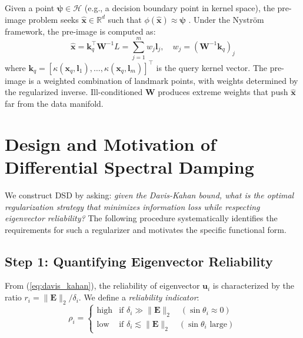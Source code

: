 \documentclass[journal]{IEEEtran}
\begin{document}
Given a point $\bm{\psi} \in \mathcal{H}$ (e.g., a decision boundary point in kernel space), the pre-image problem seeks $\hat{\bm{x}} \in \mathbb{R}^d$ such that $\phi(\hat{\bm{x}}) \approx \bm{\psi}$ \cite{kwok2004preimage}. Under the Nystr\"{o}m framework, the pre-image is computed as:
\begin{equation}
\hat{\bm{x}} = \bm{k}_q^\top \bm{W}^{-1} L = \sum_{j=1}^m w_j \bm{l}_j, \quad w_j = (\bm{W}^{-1} \bm{k}_q)_j
\label{eq:preimage}
\end{equation}
where $\bm{k}_q = [\kappa(\bm{x}_q, \bm{l}_1), \ldots, \kappa(\bm{x}_q, \bm{l}_m)]^\top$ is the query kernel vector. The pre-image is a weighted combination of landmark points, with weights determined by the regularized inverse. Ill-conditioned $\bm{W}$ produces extreme weights that push $\hat{\bm{x}}$ far from the data manifold.


\section{Design and Motivation of Differential Spectral Damping}
\label{sec:derivation}

We construct DSD by asking: \emph{given the Davis-Kahan bound, what is the optimal regularization strategy that minimizes information loss while respecting eigenvector reliability?} The following procedure systematically identifies the requirements for such a regularizer and motivates the specific functional form.

\subsection{Step 1: Quantifying Eigenvector Reliability}

From (\ref{eq:davis_kahan}), the reliability of eigenvector $\bm{u}_i$ is characterized by the ratio $r_i = \|\bm{E}\|_2 / \delta_i$. We define a \emph{reliability indicator}:
\begin{equation}
\rho_i = \begin{cases}
\text{high} & \text{if } \delta_i \gg \|\bm{E}\|_2 \quad (\sin\theta_i \approx 0) \\
\text{low} & \text{if } \delta_i \lesssim \|\bm{E}\|_2 \quad (\sin\theta_i \text{ large})
\end{cases}
\end{equation}
\end{document}
